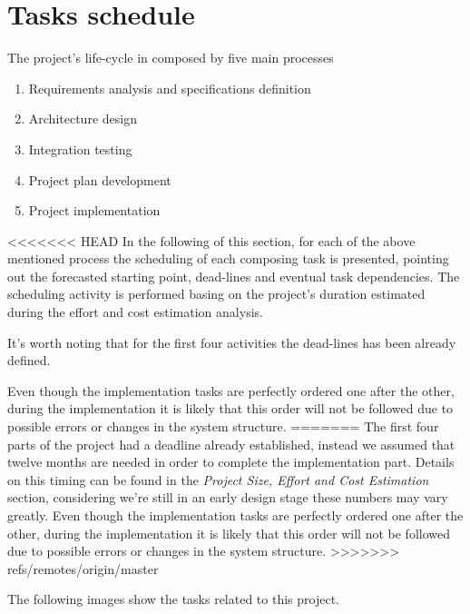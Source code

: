 \section{Tasks schedule}

The project's life-cycle in composed by five main processes

\begin{enumerate}
	\item Requirements analysis and specifications definition
	\item Architecture design 
	\item Integration testing
	\item Project plan development
	\item Project implementation
\end{enumerate}

<<<<<<< HEAD
In the following of this section, for each of the above mentioned process the scheduling of each composing task is presented, pointing out the forecasted starting point, dead-lines and eventual task dependencies.
The scheduling activity is performed basing on the project's duration estimated during the effort and cost estimation analysis.

It's worth noting that for the first four activities the dead-lines has been already defined.

Even though the implementation tasks are perfectly ordered one after the other, during the implementation it is likely that this order will not be followed due to possible errors or changes in the system structure.
=======
The first four parts of the project had a deadline already established, instead
we assumed that twelve months are needed in order to complete the implementation
part. Details on this timing can be found in the \textit{Project Size, Effort
and Cost Estimation} section, considering we're still in an early design stage
these numbers may vary greatly. Even though the implementation tasks are
perfectly ordered one after the other, during the implementation it is likely
that this order will not be followed due to possible errors or changes in the
system structure.
>>>>>>> refs/remotes/origin/master

The following images show the tasks related to this project.

